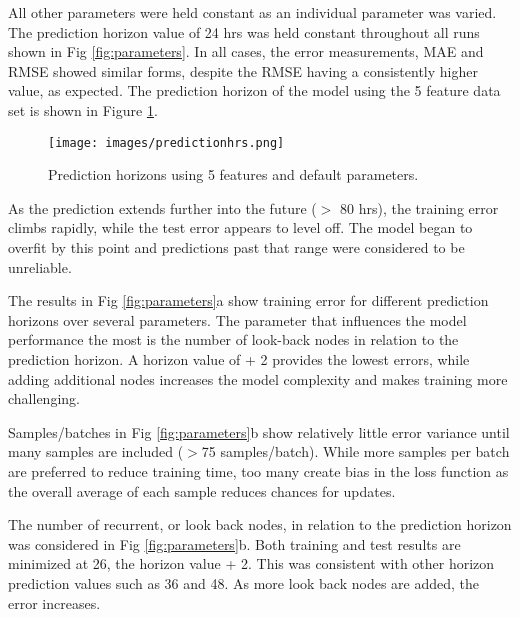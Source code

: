 \begin{linenumbers}
%
All other parameters were held constant as an individual parameter was varied. The prediction horizon value of 24 hrs was held constant throughout all runs shown in  Fig \ref{fig:parameters}. In all cases, the error measurements, MAE and RMSE showed similar forms, despite the RMSE having a consistently higher value, as expected. The prediction horizon of the model using the 5 feature data set is shown in Figure \ref{fig:predictionhrs}.

%
\begin{figure}[H]
\centering
\texttt{[image: images/predictionhrs.png]}
\caption{Prediction horizons using 5 features and default parameters.}
\label{fig:predictionhrs}
\end{figure}
%
As the prediction extends further into the future ($>$ 80 hrs), the training error climbs rapidly, while the test error appears to level off. The model began to overfit by this point and predictions past that range were considered to be unreliable.

The results in  Fig \ref{fig:parameters}a show training error for different prediction horizons over several parameters. The parameter that influences the model performance the most is the number of look-back nodes in relation to the prediction horizon. A horizon value of + 2 provides the lowest errors, while adding additional nodes increases the model complexity and makes training more challenging. 

Samples/batches in Fig \ref{fig:parameters}b show relatively little error variance until many samples are included ($>$75 samples/batch). While more samples per batch are preferred to reduce training time, too many create bias in the loss function as the overall average of each sample reduces chances for updates.

The number of recurrent, or look back nodes, in relation to the prediction horizon was considered in  Fig \ref{fig:parameters}b. Both training and test results are minimized at 26, the horizon value + 2. This was consistent with other horizon prediction values such as 36 and 48. As more look back nodes are added, the error increases.


\end{linenumbers}
